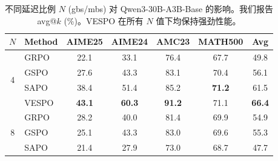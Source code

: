\documentclass{article}
\theoremstyle{plain}
\theoremstyle{definition}
\theoremstyle{remark}
\begin{document}
\begin{table}[t]
  \caption{不同延迟比例 $N$  (gbs/mbs) 对 Qwen3-30B-A3B-Base 的影响。我们报告 avg@$k$  (\%)。VESPO 在所有 $N$  值下均保持强劲性能。}
  \label{tab:staleness}
  \centering
  \begin{small}
    \setlength{\tabcolsep}{3.5pt}
    \begin{tabular}{@{}c|l|ccccc@{}}
      \toprule
      $N$ & Method                        & AIME25                                & AIME24                                & AMC23                                 & MATH500                               & Avg                                   \\
      \midrule
      \multirow{4}{*}{4}
          & GRPO                          & 22.1                                  & 33.1                                  & 76.4                                  & 67.7                                  & 49.8                                  \\
          & GSPO                          & 27.6                                  & 43.3                                  & 83.1                                  & 70.4                                  & 56.1                                  \\
          & SAPO                          & 38.4                                  & 51.4                                  & 85.2                                  & \textbf{71.2}                         & 61.5                                  \\
          & \cellcolor{ourhighlight}VESPO & \cellcolor{ourhighlight}\textbf{43.1} & \cellcolor{ourhighlight}\textbf{60.3} & \cellcolor{ourhighlight}\textbf{91.2} & \cellcolor{ourhighlight}71.1          & \cellcolor{ourhighlight}\textbf{66.4} \\
      \midrule
      \multirow{4}{*}{8}
          & GRPO                          & 28.2                                  & 40.0                                  & 81.4                                  & 69.9                                  & 54.9                                  \\
          & GSPO                          & 25.1                                  & 43.3                                  & 83.0                                  & 69.6                                  & 55.3                                  \\
          & SAPO                          & 21.4                                  & 27.9                                  & 73.0                                  & 68.7                                  & 47.7                                  \\

\end{tabular}
\end{small}
\end{table}
\end{document}
